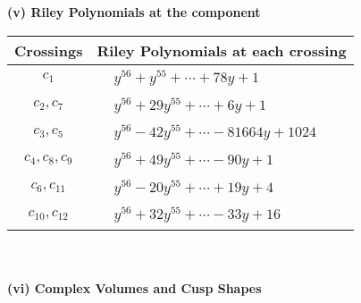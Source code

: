 \documentclass[1p]{elsarticle_modified}
\theoremstyle{definition}
\begin{document}
\newpage\renewcommand{\arraystretch}{1}
\flushleft \textbf{(v) Riley Polynomials at the component}\newline \\
\begin{tabular}{m{50pt}|m{274pt}}
Crossings & \hspace{64pt}Riley Polynomials at each crossing \\
\hline $$\begin{aligned}c_{1}\end{aligned}$$&$\begin{aligned}
&y^{56}+y^{55}+\cdots+78 y+1
\end{aligned}$\\
\hline $$\begin{aligned}c_{2},c_{7}\end{aligned}$$&$\begin{aligned}
&y^{56}+29 y^{55}+\cdots+6 y+1
\end{aligned}$\\
\hline $$\begin{aligned}c_{3},c_{5}\end{aligned}$$&$\begin{aligned}
&y^{56}-42 y^{55}+\cdots-81664 y+1024
\end{aligned}$\\
\hline $$\begin{aligned}c_{4},c_{8},c_{9}\end{aligned}$$&$\begin{aligned}
&y^{56}+49 y^{55}+\cdots-90 y+1
\end{aligned}$\\
\hline $$\begin{aligned}c_{6},c_{11}\end{aligned}$$&$\begin{aligned}
&y^{56}-20 y^{55}+\cdots+19 y+4
\end{aligned}$\\
\hline $$\begin{aligned}c_{10},c_{12}\end{aligned}$$&$\begin{aligned}
&y^{56}+32 y^{55}+\cdots-33 y+16
\end{aligned}$\\
\hline
\end{tabular}\\~\\
\newpage\flushleft \textbf{(vi) Complex Volumes and Cusp Shapes}
\end{document}
